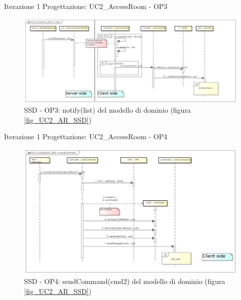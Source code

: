 \documentclass[t]{beamer} %
\begin{document}
\begin{frame} {Iterazione 1 Progettazione: UC2\_AccessRoom - OP3}
   \begin{figure}
     \includegraphics[scale=0.24]{image_astah/Iteration_1_DesignModel/UC2_AccessRoom_SSD_3_notify.png}{\centering}
     \caption{SSD - OP3: notify(list) del modello di dominio (figura \ref{fig_UC2_AR_SSD})}
     \label{fig_UC2_SSD_AC_3} 
   \end{figure}
\end{frame}

\begin{frame} {Iterazione 1 Progettazione: UC2\_AccessRoom - OP4}
   \begin{figure}
     \includegraphics[scale=0.26]{image_astah/Iteration_1_DesignModel/UC2_AccessRoom_SSD_4_sendCommand.png}{\centering}
     \caption{SSD - OP4: sendCommand(cmd2) del modello di dominio (figura \ref{fig_UC2_AR_SSD}) }
     \label{fig_UC2_SSD_AC_4} 
   \end{figure}
\end{frame}
\end{document}
